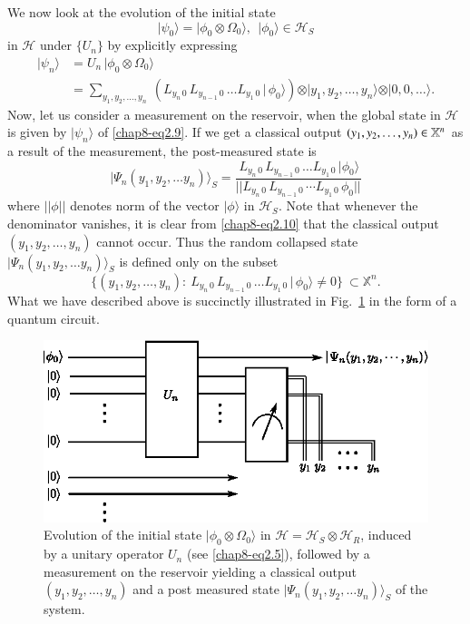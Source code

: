 We now look at the evolution of the initial state 
\begin{equation}
\vert\psi_0\rangle=\vert \phi_0\otimes \Omega_0\rangle,\ \  \vert\phi_0\rangle\in \mathcal{H}_S  \label{chap8-eq2.8}
\end{equation}  
in $\mathcal{H}$ under $\{U_n\}$ by explicitly expressing
\begin{align} 
\vert\psi_n\rangle &= U_n\, \vert \phi_0\otimes \Omega_0\rangle \nonumber \\ 
&= \sum_{y_1,y_2,\ldots , y_n}\ \left( L_{y_n\, 0}\, L_{y_{n-1}\, 0}\, \ldots L_{y_1\, 0}\, \vert\,\phi_0\rangle\right) \otimes \vert y_1, y_2,\ldots ,y_n\rangle \otimes \vert 0, 0, \ldots \rangle. \label{chap8-eq2.9}
\end{align} 
Now, let us consider a measurement on the reservoir, when the global state in $\mathcal{H}$ is  
given by $\vert\psi_n\rangle$ of \ref{chap8-eq2.9}. If we get a classical output $(y_1,y_2,\ldots,\break y_n)\in \mathbb{X}^n$ as a result of the measurement, the post-measured  state is  
\begin{equation} 
\vert \Psi_n(y_1,y_2,\ldots y_n)\rangle_S=\frac{\, L_{y_n\, 0}\, L_{y_{n-1}\, 0}\, \ldots L_{y_1\, 0}\, \vert\phi_0\rangle }
{\vert\vert L_{y_n\, 0}\, L_{y_{n-1}\, 0}\, \cdots L_{y_1\, 0}\, \phi_0\vert\vert}  \label{chap8-eq2.10}
\end{equation}
where $\vert\vert \phi \vert\vert$ denotes norm of the vector $\vert\phi\rangle$ in $\mathcal{H}_S$. Note that whenever the denominator vanishes, it is clear from \ref{chap8-eq2.10} that the classical output $(y_1,y_2,\ldots, y_n)$ cannot occur. Thus the random collapsed state $\vert \Psi_n(y_1,y_2,\ldots y_n)\rangle_S$ is defined only on the subset 
$$
\{(y_1,y_2,\ldots , y_n):\    L_{y_n\, 0}\, L_{y_{n-1}\, 0}\, \ldots L_{y_1\, 0}\, \vert\,\phi_0\rangle\neq 0\}\  \subset \mathbb{X}^n.
$$ 
What we have described above is succinctly illustrated  in Fig.~\ref{chap8-fig1} in the form of a quantum circuit. 
\begin{figure}[H]
\centering
\includegraphics{figures/chap5-fig1.eps}
\caption{Evolution of the initial state $\vert\phi_0\otimes \Omega_0\rangle$  in $\mathcal{H}=\mathcal{H}_S\otimes \mathcal{H}_R$, induced by a unitary operator $U_n$ (see \eqref{chap8-eq2.5}), followed by a measurement on the reservoir yielding a classical output $(y_1,y_2,\ldots, y_n)$ and a post measured state $\vert \Psi_n(y_1,y_2,\ldots y_n)\rangle_S$ of the system.}\label{chap8-fig1}
\end{figure}

